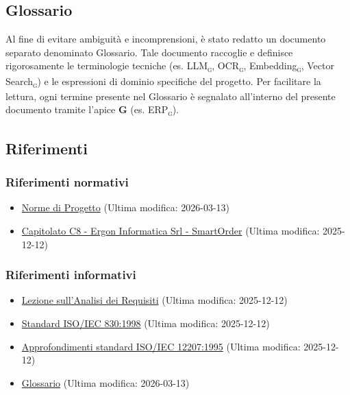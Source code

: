 \documentclass[a4paper, 11pt, oneside]{scrartcl} %
\begin{document}
\subsection{Glossario}
Al fine di evitare ambiguità e incomprensioni, è stato redatto un documento separato denominato Glossario. Tale documento raccoglie e definisce rigorosamente le terminologie tecniche (es. LLM\textsubscript{\textsc{g}}, OCR\textsubscript{\textsc{g}}, Embedding\textsubscript{\textsc{g}}, Vector Search\textsubscript{\textsc{g}}) e le espressioni di dominio specifiche del progetto.
Per facilitare la lettura, ogni termine presente nel Glossario è segnalato all'interno del presente documento tramite l'apice \textbf{G} (es. ERP\textsubscript{\textsc{g}}).

\subsection{Riferimenti}
\subsubsection{Riferimenti normativi}
\begin{itemize}
    \item \href{https://swenightpro.github.io/Documentazione/docs/RTB/Documentazione%20Interna/Norme_di_Progetto_v2.0.pdf}{Norme di Progetto} (Ultima modifica: 2026-03-13)
    \item \href{https://www.math.unipd.it/~tullio/IS-1/2025/Progetto/C8.pdf}{Capitolato C8 - Ergon Informatica Srl - SmartOrder} (Ultima modifica: 2025-12-12)
\end{itemize}

\subsubsection{Riferimenti informativi}
\begin{itemize}
    \item \href{https://www.math.unipd.it/~tullio/IS-1/2025/Dispense/T05.pdf}{Lezione sull'Analisi dei Requisiti} (Ultima modifica: 2025-12-12)
    \item \href{https://ieeexplore.ieee.org/document/720574}{Standard ISO/IEC 830:1998} (Ultima modifica: 2025-12-12)
    \item \href{https://www.math.unipd.it/~tullio/IS-1/2009/Approfondimenti/ISO_12207-1995.pdf}{Approfondimenti standard ISO/IEC 12207:1995} (Ultima modifica: 2025-12-12)
    \item \href{https://swenightpro.github.io/Documentazione/docs/RTB/Documentazione%20Esterna/Glossario_v2.0.pdf}{Glossario} (Ultima modifica: 2026-03-13)
\end{itemize}
\end{document}
